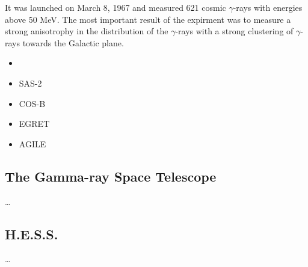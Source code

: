 It was launched on March 8, 1967 and measured
621 cosmic $\gamma$-rays with energies above 50 MeV.
The most important result of the expirment was to
measure a strong anisotrophy in the distribution of 
the $\gamma$-rays with a strong clustering of 
$\gamma$-rays towards the Galactic plane.
\fig



\begin{itemize}
\item 
  

  \item SAS-2
  \item COS-B
  \item EGRET

  \item AGILE
\end{itemize}

\subsection{The \fermi Gamma-ray Space Telescope}

\ldots


\subsection{H.E.S.S.}

\ldots
